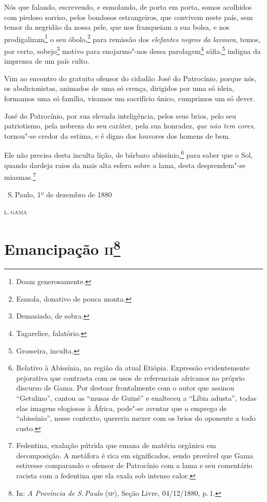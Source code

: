 Nós que falando, escrevendo, e esmolando, de porta em porta, somos
acolhidos com piedoso sorriso, pelos bondosos estrangeiros, que convivem
neste país, sem temor da negridão da nossa pele, que nos franqueiam a
sua bolsa, e nos prodigalizam\footnote{Doam generosamente.} o seu
óbolo,\footnote{Esmola, donativo de pouca monta.} para remissão dos
\emph{elefantes negros da lavoura}, temos, por certo, sobejo\footnote{
  Demasiado, de sobra.} motivo para enojarmo"-nos dessa
parolagem\footnote{Tagarelice, falatório.} sáfia,\footnote{
  Grosseira, inculta.} indigna da imprensa de um país culto.

Vim ao encontro do gratuito ofensor do cidadão José do Patrocínio,
porque nós, os abolicionistas, animados de uma só crença, dirigidos por
uma só ideia, formamos uma só família, visamos um sacrifício único,
cumprimos um só dever.

José do Patrocínio, por sua elevada inteligência, pelos seus brios, pelo
seu patriotismo, pela nobreza do seu caráter, pela sua honradez,
\emph{que não tem cores}, tornou"-se credor da estima, e é digno dos
louvores dos homens de bem.

Ele não precisa desta inculta lição, de bárbaro abissínio,\footnote{
  Relativo à Abissínia, na região da atual Etiópia. Expressão
  evidentemente pejorativa que contrasta com os usos de referenciais
  africanos no próprio discurso de Gama. Por destoar frontalmente com o
  autor que assinou ``Getulino'', cantou as ``musas de Guiné'' e enalteceu a
  ``Líbia adusta'', todas elas imagens elogiosas à África, pode"-se aventar
  que o emprego de ``abissínio'', nesse contexto, quereria mexer com os
  brios do oponente a todo custo.} para saber que o Sol, quando dardeja
raios da mais alta esfera sobre a lama, desta desprendem"-se
miasmas.\footnote{Fedentina, exalação pútrida que emana de matéria
  orgânica em decomposição. A metáfora é rica em significados, sendo
  provável que Gama estivesse comparando o ofensor de Patrocínio com a
  lama e seu comentário racista com a fedentina que ela exala sob
  intenso calor.}

\bigskip

\hfill\ S.\,Paulo, 1º de dezembro de 1880\smallskip

\hfill\textsc{l.\,gama}


\chapter{Emancipação \textsc{ii}\footnote[*]{In: \emph{A Província de S.\,Paulo} (\textsc{sp}), Seção Livre, 04/12/1880, p.\,1.}} %

